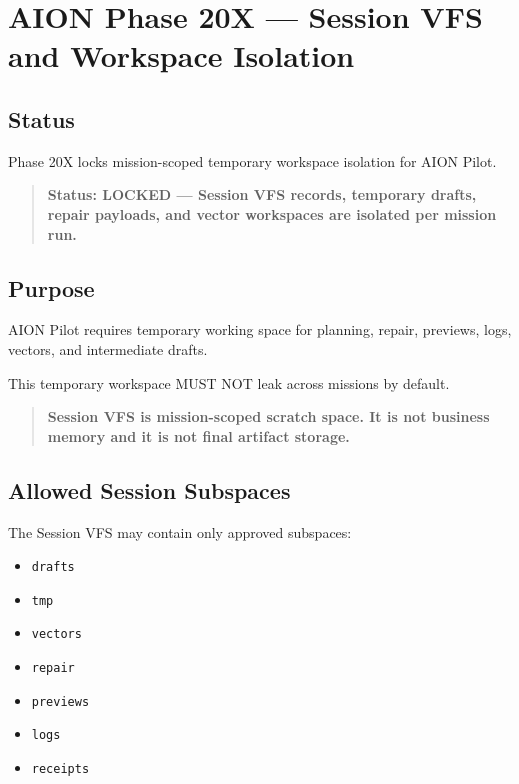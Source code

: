 \section{AION Phase 20X --- Session VFS and Workspace Isolation}
\label{sec:aion-phase20x-session-vfs}

\subsection{Status}

Phase 20X locks mission-scoped temporary workspace isolation for AION Pilot.

\begin{quote}
\textbf{Status: LOCKED --- Session VFS records, temporary drafts, repair payloads, and vector workspaces are isolated per mission run.}
\end{quote}

\subsection{Purpose}

AION Pilot requires temporary working space for planning, repair, previews, logs, vectors, and intermediate drafts.

This temporary workspace MUST NOT leak across missions by default.

\begin{quote}
\textbf{Session VFS is mission-scoped scratch space. It is not business memory and it is not final artifact storage.}
\end{quote}

\subsection{Allowed Session Subspaces}

The Session VFS may contain only approved subspaces:

\begin{itemize}
  \item \texttt{drafts}
  \item \texttt{tmp}
  \item \texttt{vectors}
  \item \texttt{repair}
  \item \texttt{previews}
  \item \texttt{logs}
  \item \texttt{receipts}
\end{itemize}

